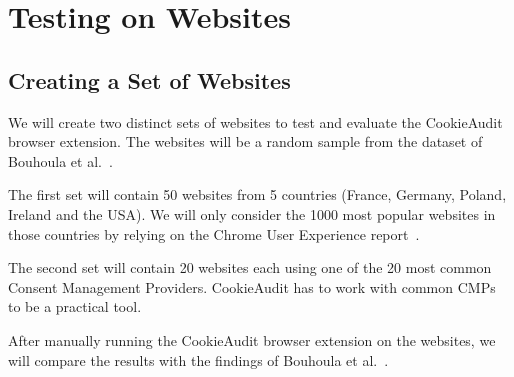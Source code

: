 \chapter{Testing on Websites}

\section{Creating a Set of Websites}

We will create two distinct sets of websites to test and evaluate the CookieAudit browser extension. 
The websites will be a random sample from the dataset of Bouhoula et al.~\cite{bouhoula2023automated}. 

The first set will contain 50 websites from 5 countries (France, Germany, Poland, Ireland and the USA).
We will only consider the 1000 most popular websites in those countries by relying on the Chrome User Experience report~\cite{GoogleCrux}. 

The second set will contain 20 websites each using one of the 20 most common Consent Management Providers. CookieAudit has to work with common CMPs to be a practical tool.

After manually running the CookieAudit browser extension on the websites, we will compare the results with the findings of Bouhoula et al.~\cite{bouhoula2023automated}.